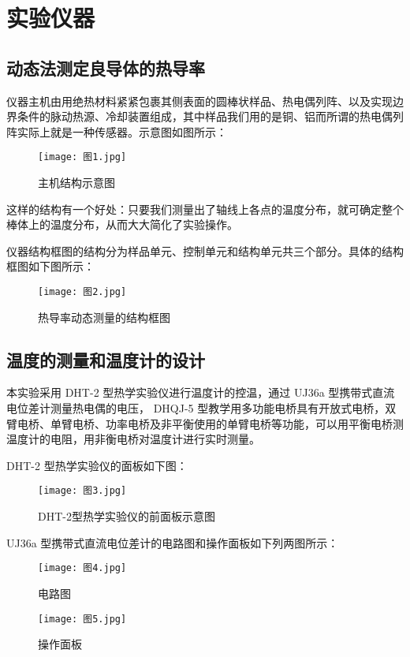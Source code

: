 \documentclass[11pt]{article}
\begin{document}
\section{实验仪器}

\subsection{动态法测定良导体的热导率}

仪器主机由用绝热材料紧紧包裹其侧表面的圆棒状样品、热电偶列阵、以及实现边界条件的脉动热源、冷却装置组成，其中样品我们用的是铜、铝而所谓的热电偶列阵实际上就是一种传感器。示意图如图所示：

\begin{figure}[H]
    \centering
    \texttt{[image: 图1.jpg]}
    \caption{主机结构示意图}
\end{figure}

这样的结构有一个好处：只要我们测量出了轴线上各点的温度分布，就可确定整个棒体上的温度分布，从而大大简化了实验操作。

仪器结构框图的结构分为样品单元、控制单元和结构单元共三个部分。具体的结构框图如下图所示：

\begin{figure}[H]
    \centering
    \texttt{[image: 图2.jpg]}
    \caption{热导率动态测量的结构框图}
\end{figure}

\subsection{温度的测量和温度计的设计}

本实验采用 DHT-2 型热学实验仪进行温度计的控温，通过 UJ36a 型携带式直流电位差计测量热电偶的电压， DHQJ-5 型教学用多功能电桥具有开放式电桥，双臂电桥、单臂电桥、功率电桥及非平衡使用的单臂电桥等功能，可以用平衡电桥测温度计的电阻，用非衡电桥对温度计进行实时测量。

DHT-2 型热学实验仪的面板如下图：

\begin{figure}[H]
  \centering
  \texttt{[image: 图3.jpg]}
  \caption{DHT-2型热学实验仪的前面板示意图}
\end{figure}

UJ36a 型携带式直流电位差计的电路图和操作面板如下列两图所示：

\begin{figure}[H]
  \begin{minipage}[t]{0.6\linewidth}
      \centering
      \texttt{[image: 图4.jpg]}
      \caption{电路图}
  \end{minipage}
  \begin{minipage}[t]{0.39\linewidth}
      \centering
      \texttt{[image: 图5.jpg]}
      \caption{操作面板}
  \end{minipage}
\end{figure}
\end{document}
